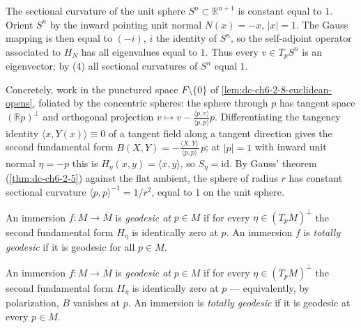 \begin{example}[curvature of $S^n$]
  \label{ex:dc-ch6-2-8}
  \leanok
  The sectional curvature of the unit sphere $S^n\subset\mathbb{R}^{n+1}$ is constant
  equal to $1$. Orient $S^n$ by the inward pointing unit normal $N(x)=-x$,
  $|x|=1$. The Gauss mapping is then equal to $(-i)$, $i$ the identity of $S^n$, so
  the self-adjoint operator associated to $H_N$ has all eigenvalues equal to $1$.
  Thus every $v\in T_pS^n$ is an eigenvector; by (4) all sectional curvatures of
  $S^n$ equal $1$.

  Concretely, work in the punctured space $F\setminus\{0\}$ of
  \cref{lem:dc-ch6-2-8-euclidean-opens}, foliated by the concentric spheres:
  the sphere through $p$ has tangent space $(\mathbb{R}p)^\perp$ and
  orthogonal projection $v\mapsto v-\frac{\langle p,v\rangle}{\langle
  p,p\rangle}p$. Differentiating the tangency identity $\langle x,
  Y(x)\rangle\equiv0$ of a tangent field along a tangent direction gives the
  second fundamental form $B(X,Y)=-\frac{\langle X,Y\rangle}{\langle
  p,p\rangle}\,p$; at $|p|=1$ with inward unit normal $\eta=-p$ this is
  $H_\eta(x,y)=\langle x,y\rangle$, so $S_\eta=\mathrm{id}$. By Gauss'
  theorem (\cref{thm:dc-ch6-2-5}) against the flat ambient, the sphere of
  radius $r$ has constant sectional curvature $\langle
  p,p\rangle^{-1}=1/r^2$, equal to $1$ on the unit sphere.
  
  An immersion $f:M\to\overline{M}$ is \emph{geodesic at} $p\in M$ if for every
  $\eta\in(T_pM)^\perp$ the second fundamental form $H_\eta$ is identically zero at
  $p$. An immersion $f$ is \emph{totally geodesic} if it is geodesic for all $p\in M$.
\end{example}

\begin{definition}
  \label{def:dc-ch6-2-8-geodesic}
  \leanok
  An immersion $f:M\to\overline{M}$ is \emph{geodesic at} $p\in M$ if for every
  $\eta\in(T_pM)^\perp$ the second fundamental form $\mathit{II}_\eta$ is
  identically zero at $p$ — equivalently, by polarization, $B$ vanishes at $p$.
  An immersion is \emph{totally geodesic} if it is geodesic at every
  $p\in M$.
\end{definition}

